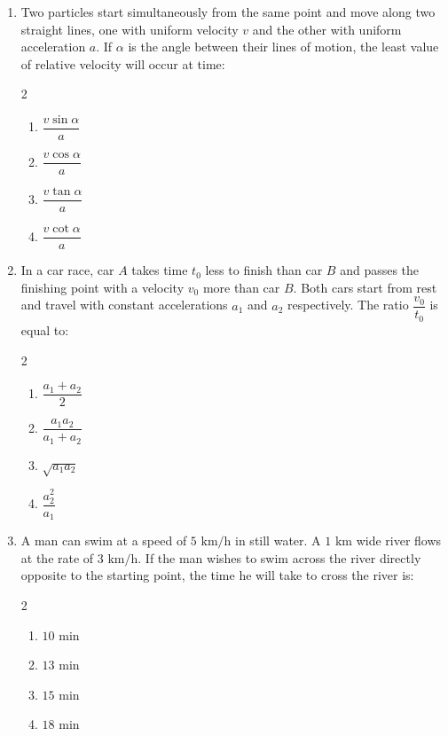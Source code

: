 \documentclass[11pt,a4paper]{article}
\begin{document}
\begin{enumerate}[label=\textbf{\textcolor{l1Green}{Q\arabic*.}},leftmargin=24pt,itemsep=10pt]

  \item Two particles start simultaneously from the same point and move along two straight lines, one with uniform velocity $v$ and the other with uniform acceleration $a$. If $\alpha$ is the angle between their lines of motion, the least value of relative velocity will occur at time:
  \begin{multicols}{2}
  \begin{enumerate}[label=\textbf{\textcolor{primaryDark}{(\Alph*)}},itemsep=2pt]
    \item $\dfrac{v\sin\alpha}{a}$
    \item $\dfrac{v\cos\alpha}{a}$
    \item $\dfrac{v\tan\alpha}{a}$
    \item $\dfrac{v\cot\alpha}{a}$
  \end{enumerate}
  \end{multicols}

  \item In a car race, car $A$ takes time $t_0$ less to finish than car $B$ and passes the finishing point with a velocity $v_0$ more than car $B$. Both cars start from rest and travel with constant accelerations $a_1$ and $a_2$ respectively. The ratio $\dfrac{v_0}{t_0}$ is equal to:
  \begin{multicols}{2}
  \begin{enumerate}[label=\textbf{\textcolor{primaryDark}{(\Alph*)}},itemsep=2pt]
    \item $\dfrac{a_1 + a_2}{2}$
    \item $\dfrac{a_1 a_2}{a_1 + a_2}$
    \item $\sqrt{a_1 a_2}$
    \item $\dfrac{a_2^2}{a_1}$
  \end{enumerate}
  \end{multicols}

  \item A man can swim at a speed of $5\text{ km/h}$ in still water. A $1\text{ km}$ wide river flows at the rate of $3\text{ km/h}$. If the man wishes to swim across the river directly opposite to the starting point, the time he will take to cross the river is:
  \begin{multicols}{2}
  \begin{enumerate}[label=\textbf{\textcolor{primaryDark}{(\Alph*)}},itemsep=2pt]
    \item $10\text{ min}$
    \item $13\text{ min}$
    \item $15\text{ min}$
    \item $18\text{ min}$
  \end{enumerate}
  \end{multicols}


\end{enumerate}
\end{document}
